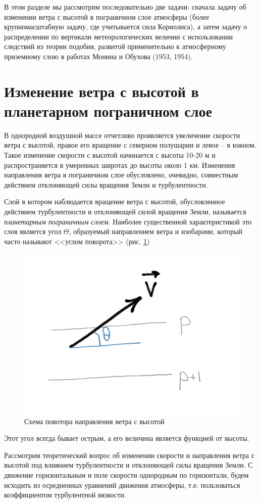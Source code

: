 В этом разделе мы рассмотрим последовательно две задачи: сначала задачу об изменении ветра с высотой в пограничном слое атмосферы (более крупномасштабную задачу, где учитывается сила Кориолиса), а затем задачу о распределении по вертикали метеорологических величин с использовании следствий из теории подобия, развитой применительно к атмосферному приземному слою в работах {\color{red}Монина и Обухова (1953, 1954). }

\section{{\color{done}Изменение ветра с высотой в планетарном пограничном слое}}
В однородной воздушной массе отчетливо проявляется увеличение скорости ветра с высотой, правое его вращение с северном полушарии и левое -- в южном. Такое изменение скорости с высотой начинается с высоты 10-20 м и распространяется в умеренных широтах до высоты около 1 км. Изменения направления ветра в пограничном слое обусловлено, очевидно, совместным действием отклоняющей силы вращения Земли и турбулентности. 

Слой в котором наблюдается вращение ветра с высотой, обусловленное действием турбулентности и отклоняющей силой вращения Земли, называется \textit{планетарным пограничным слоем}. Наиболее существенной характеристикой это слоя является угол $\Theta$, образуемый направлением ветра и изобарами, который часто называют <<углом поворота>> (рис. \ref{fig:ch14-2_wind_turn})
    \begin{figure}[h]
        \centering
        \includegraphics[width=0.5\linewidth]{pics/ch14-2_wind_turn.png}
    \caption{\label{fig:ch14-2_wind_turn} {\color{red}Схема повотора направления ветра с высотой }}
    \end{figure}
Этот угол всегда бывает острым, а его величина является функцией от высоты.

Рассмотрим теоретический вопрос об изменении скорости и направления ветра с высотой под влиянием турбулентности и отклоняющей силы вращения Земли. С движение горизонтальным и поле скорости однородным по горизонтали, будем исходить из осредненных уравнений движения атмосферы, т.е. пользоваться коэффициентом турбулентной вязкости. 


